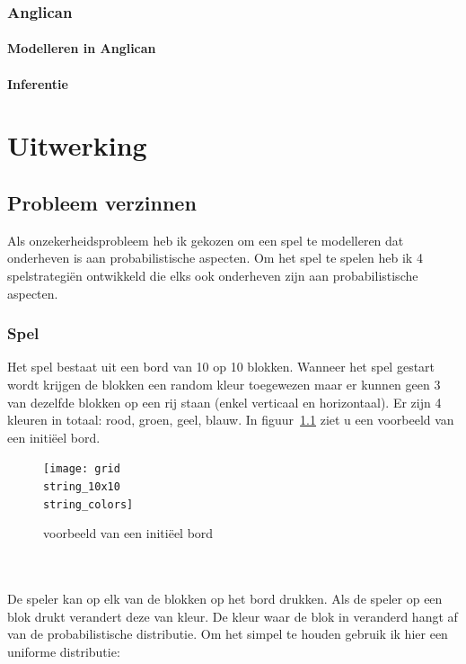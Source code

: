 \documentclass[12pt,a4paper,oneside]{book}
\theoremstyle{definition}
\begin{document}
\subsection{Anglican}
\label{sec:Anglican}
\subsubsection{Modelleren in Anglican}
\label{subsubsec:ModellerenInAnglican}
\subsubsection{Inferentie}
\label{subsubsec:InferentieAnglican}


\chapter{Uitwerking}
\section{Probleem verzinnen}
Als onzekerheidsprobleem heb ik gekozen om een spel te modelleren dat onderheven is aan probabilistische aspecten. Om het spel te spelen heb ik 4 spelstrategiën ontwikkeld die elks ook onderheven zijn aan probabilistische aspecten.
\subsection{Spel}
Het spel bestaat uit een bord van 10 op 10 blokken. Wanneer het spel gestart wordt krijgen de blokken een random kleur toegewezen maar er kunnen geen 3 van dezelfde blokken op een rij staan (enkel verticaal en horizontaal). Er zijn 4 kleuren in totaal: rood, groen, geel, blauw. In figuur~\ref{figure:initialboard} ziet u een voorbeeld van een initi\"{e}el bord.
\begin{figure}
	\centering
	\texttt{[image: grid\\string\_10x10\\string\_colors]}
	\caption{voorbeeld van een initi\"{e}el bord}
	\label{figure:initialboard}
\end{figure}
\\\\
De speler kan op elk van de blokken op het bord drukken. Als de speler op een blok drukt verandert deze van kleur. De kleur waar de blok in veranderd hangt af van de probabilistische distributie. Om het simpel te houden gebruik ik hier een uniforme distributie:
\end{document}
